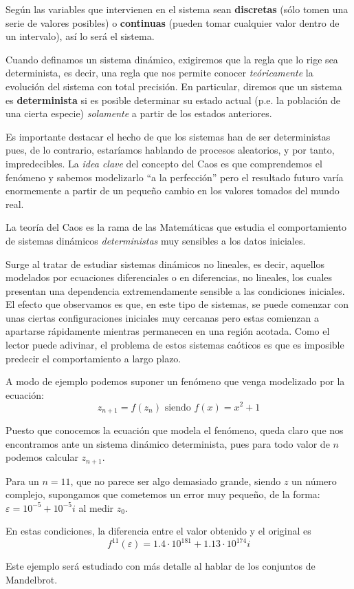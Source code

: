 Según las variables que intervienen en el sistema sean \textbf{discretas} (sólo tomen una serie de valores posibles) o \textbf{continuas} (pueden tomar cualquier valor dentro de un intervalo), así lo será el sistema.

Cuando definamos un sistema dinámico, exigiremos que la regla que lo rige sea determinista, es decir, una regla que nos permite conocer \emph{teóricamente} la evolución del sistema con total precisión. En particular, diremos que un sistema es \textbf{determinista} si es posible determinar su estado actual (p.e. la población de una cierta especie) \emph{solamente} a partir de los estados anteriores.

Es importante destacar el hecho de que los sistemas han de ser deterministas pues, de lo contrario, estaríamos hablando de procesos aleatorios, y por tanto, impredecibles. La \emph{idea clave} del concepto del Caos es que comprendemos el fenómeno y sabemos modelizarlo ``a la perfección'' pero el resultado futuro varía enormemente a partir de un pequeño cambio en los valores tomados del mundo real.


\begin{definition}
La teoría del Caos es la rama de las Matemáticas que estudia el comportamiento de sistemas dinámicos \emph{deterministas} muy sensibles a los datos iniciales.
\end{definition}
Surge al tratar de estudiar sistemas dinámicos no lineales, es decir, aquellos modelados por ecuaciones diferenciales o en diferencias, no lineales, los cuales presentan una dependencia extremendamente sensible a las condiciones iniciales. El efecto que observamos es que, en este tipo de sistemas, se puede comenzar con unas ciertas configuraciones iniciales muy cercanas pero estas comienzan a apartarse rápidamente mientras permanecen en una región acotada. Como el lector puede adivinar, el problema de estos sistemas caóticos es que es imposible predecir el comportamiento a largo plazo.
\begin{example}\label{example:Julia}
A modo de ejemplo podemos suponer un fenómeno que venga modelizado por la ecuación:
\[z_{n+1} = f(z_n) \text{ siendo } f(x) = x^2+1\]

Puesto que conocemos la ecuación que modela el fenómeno, queda claro que nos encontramos ante un sistema dinámico determinista, pues para todo valor de $n$ podemos calcular $z_{n+1}$.

Para un $n=11$, que no parece ser algo demasiado grande, siendo $z$ un número complejo, supongamos que cometemos un error muy pequeño, de la forma: $ε=10^{-5}+10^{-5}i$ al medir $z_0$.

En estas condiciones, la diferencia entre el valor obtenido y el original es
\[f^{11}(ε)=1.4 \cdot 10^{181} + 1.13\cdot 10^{174}i\]

Este ejemplo será estudiado con más detalle al hablar de los conjuntos de Mandelbrot.
\end{example}

